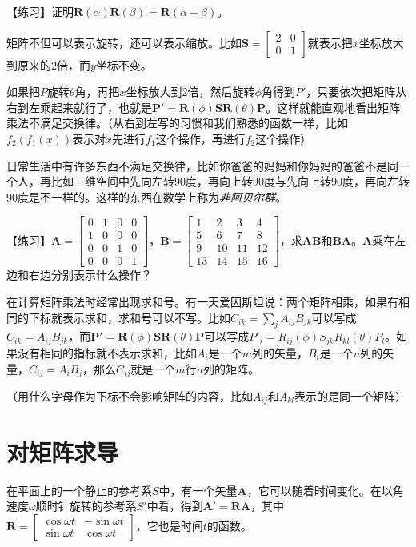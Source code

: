 【练习】证明$\mathbf{R}(\alpha) \mathbf{R}(\beta)=\mathbf{R}(\alpha+\beta)$。

矩阵不但可以表示旋转，还可以表示缩放。比如$\mathbf{S}=\begin{bmatrix}
2 & 0 \\
0 & 1
\end{bmatrix}$就表示把$x$坐标放大到原来的$2$倍，而$y$坐标不变。

如果把$P$旋转$\theta$角，再把$x$坐标放大到$2$倍，然后旋转$\phi$角得到$P'$，只要依次把矩阵从右到左乘起来就行了，也就是$\mathbf{P'}=\mathbf{R}(\phi) \mathbf{S} \mathbf{R}(\theta) \mathbf{P}$。这样就能直观地看出矩阵乘法不满足交换律。（从右到左写的习惯和我们熟悉的函数一样，比如$f_2(f_1(x))$表示对$x$先进行$f_1$这个操作，再进行$f_2$这个操作）

日常生活中有许多东西不满足交换律，比如你爸爸的妈妈和你妈妈的爸爸不是同一个人，再比如三维空间中先向左转$90$度，再向上转$90$度与先向上转$90$度，再向左转$90$度是不一样的。这样的东西在数学上称为\emph{非阿贝尔群}。

【练习】$\mathbf{A}=\begin{bmatrix}
0 & 1 & 0 & 0 \\
1 & 0 & 0 & 0 \\
0 & 0 & 1 & 0 \\
0 & 0 & 0 & 1
\end{bmatrix}$，$\mathbf{B}=\begin{bmatrix}
1 & 2 & 3 & 4 \\
5 & 6 & 7 & 8 \\
9 & 10 & 11 & 12 \\
13 & 14 & 15 & 16
\end{bmatrix}$，求$\mathbf{A} \mathbf{B}$和$\mathbf{B} \mathbf{A}$。$\mathbf{A}$乘在左边和右边分别表示什么操作？

在计算矩阵乘法时经常出现求和号。有一天爱因斯坦说：两个矩阵相乘，如果有相同的下标就表示求和，求和号可以不写。比如$C_{i k}=\sum_j A_{i j} B_{j k}$可以写成$C_{i k}=A_{i j} B_{j k}$，而$\mathbf{P'}=\mathbf{R}(\phi) \mathbf{S} \mathbf{R}(\theta) \mathbf{P}$可以写成$P'_i=R_{i j}(\phi) S_{j k} R_{k l}(\theta) P_l$。如果没有相同的指标就不表示求和，比如$A_i$是一个$m$列的矢量，$B_i$是一个$n$列的矢量，$C_{i j}=A_i B_j$，那么$C_{i j}$就是一个$m$行$n$列的矩阵。

（用什么字母作为下标不会影响矩阵的内容，比如$A_{i j}$和$A_{k l}$表示的是同一个矩阵）
\section{对矩阵求导}
在平面上的一个静止的参考系$S$中，有一个矢量$\mathbf{A}$，它可以随着时间变化。在以角速度$\omega$顺时针旋转的参考系$S'$中看，得到$\mathbf{A'}=\mathbf{R} \mathbf{A}$，其中$\mathbf{R}=\begin{bmatrix}
\cos \omega t & -\sin \omega t \\
\sin \omega t & \cos \omega t
\end{bmatrix}$，它也是时间$t$的函数。

